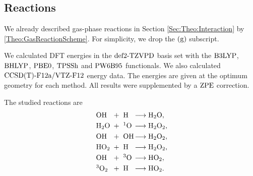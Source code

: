 \subsection{Reactions}
\label{Sec:Gas:Reaction}


We already described gas-phase reactions in Section \ref{Sec:Theo:Interaction}
by \eqref{Theo:GasReactionScheme}. For simplicity, we drop the $(\text g)$ subscript.

We calculated DFT energies in the $\text{def2-TZVPD}$ basis set with
the $\text{B3LYP}$, $\text{BHLYP}$, $\text{PBE0}$, $\text{TPSSh}$ and $\text{PW6B95}$ 
functionals. We also calculated $\text{CCSD(T)-F12a}/\text{VTZ-F}12$ energy data. The energies are
given at the optimum geometry for each method. All
results were supplemented by a $\text{ZPE}$ correction. 





The studied reactions are
\newcommand\ronebox[1]{\makebox[.8cm][l]{\enmat{#1}}}
\newcommand\rtwobox[1]{\makebox[.7cm][l]{\ \enmat{#1}}}
\newcommand\prodbox[1]{\makebox[1.55cm][l]{\enmat{#1}}}
\begin{subequations}
\begin{align}
   \label{Gas:HO+H->H2O}
   \ronebox{\ho}+\rtwobox{\te{H}}\prodbox{\chemar\hto,} \\ 
   \label{Gas:H2O+O->H2O2}
   \ronebox{\hto}+\rtwobox{^1\te{O}}\prodbox{\chemar\htot,} \\
   \label{Gas:HO+HO->H2O2}
   \ronebox{\ho}+\rtwobox{\ho}\prodbox{\chemar\htot,} \\
   \label{Gas:HO2+H->H2O2}
   \ronebox{\hot}+\rtwobox{\te{H}}\prodbox{\chemar\htot,} \\
   \label{Gas:HO+O->HO2}
   \ronebox{\ho}+\rtwobox{^3\te{O}}\prodbox{\chemar\hot,} \\
   \label{Gas:3O2+H->HO2}
   \ronebox{^3\ot}+\rtwobox{\te{H}}\prodbox{\chemar\hot.}
\end{align}
\label{Gas:Reactions}
\end{subequations}

